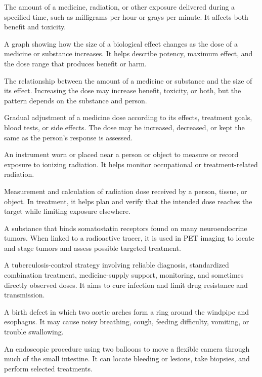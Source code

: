  The amount of a medicine, radiation, or other exposure delivered during a specified time, such as milligrams per hour or grays per minute. It affects both benefit and toxicity.

 A graph showing how the size of a biological effect changes as the dose of a medicine or substance increases. It helps describe potency, maximum effect, and the dose range that produces benefit or harm.

 The relationship between the amount of a medicine or substance and the size of its effect. Increasing the dose may increase benefit, toxicity, or both, but the pattern depends on the substance and person.

 Gradual adjustment of a medicine dose according to its effects, treatment goals, blood tests, or side effects. The dose may be increased, decreased, or kept the same as the person’s response is assessed.

 An instrument worn or placed near a person or object to measure or record exposure to ionizing radiation. It helps monitor occupational or treatment-related radiation.

 Measurement and calculation of radiation dose received by a person, tissue, or object. In treatment, it helps plan and verify that the intended dose reaches the target while limiting exposure elsewhere.

 A substance that binds somatostatin receptors found on many neuroendocrine tumors. When linked to a radioactive tracer, it is used in PET imaging to locate and stage tumors and assess possible targeted treatment.

 A tuberculosis-control strategy involving reliable diagnosis, standardized combination treatment, medicine-supply support, monitoring, and sometimes directly observed doses. It aims to cure infection and limit drug resistance and transmission.

 A birth defect in which two aortic arches form a ring around the windpipe and esophagus. It may cause noisy breathing, cough, feeding difficulty, vomiting, or trouble swallowing.

 An endoscopic procedure using two balloons to move a flexible camera through much of the small intestine. It can locate bleeding or lesions, take biopsies, and perform selected treatments.

